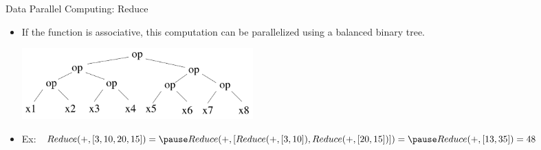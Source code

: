 \documentclass[serif,xcolor=pdftex,dvipsnames,table,hyperref={bookmarks=false,breaklinks}]{beamer}
\begin{document}
\begin{frame}[t]{Data Parallel Computing: Reduce}
\begin{itemize}

\item If the function is associative, this computation can be 
parallelized using a balanced binary tree.

\pause
{\center
\includegraphics[width=3.5in]{../Figures/reduce.png}\\
}

\pause\item Ex: $Reduce(+,[3,10,20,15]) = 
\pause Reduce(+,[Reduce(+,[3,10]),Reduce(+,[20,15])])= 
\pause Reduce(+,[13,35])= 48$

\end{itemize}
\end{frame}
\end{document}
